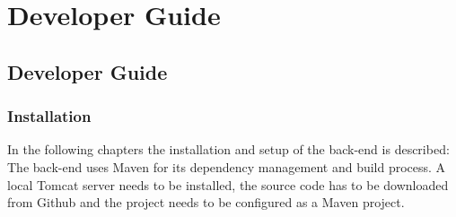 \part*{Developer Guide}
\chapter{Developer Guide}
\section{Installation}
\label{chap:installation}
In the following chapters the installation and setup of the back-end is described: The back-end uses Maven for its dependency management and build process. A local Tomcat server needs to be installed, the source code has to be downloaded from Github and the project needs to be configured as a Maven project.
